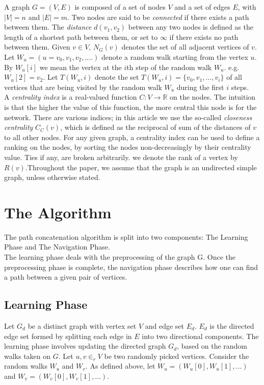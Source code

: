 \documentclass[10pt, conference, compsocconf]{IEEEtran}
\begin{document}
A graph $G=(V,E)$ is composed of a set of nodes $V$ and a set of edges  $E$, with $|V|=n$ and $|E|=m$. Two nodes are said to be {\it connected} if there exists a path between them. The {\it distance} $d(v_1, v_2)$ between any two nodes is defined as the length of a shortest path between them, or set to $\infty$ if there exists no path between them. Given $v \in V$, $N_{G}(v)$ denotes the set of all adjacent vertices of $v$. Let $W_u=(u=v_0,v_1,v_2,....)$ denote a random walk starting from the vertex $u$. By $W_u[i]$ we mean the vertex at the $i$th step of the random walk $W_u$. e.g. $W_u[2]=v_2$. Let $T(W_u,i)$ denote the set $T(W_u,i)=\{v_0,v_1,...,v_i\}$ of all vertices that are being visited by the random walk $W_u$ during the first $i$ steps.\\

A {\it centrality index} is a real-valued function $C: V \rightarrow \mathbb R$ on the nodes. %
The intuition is that the higher the value of this function, the more central this node is for the network. There are various indices; in this article we use the so-called {\it closeness centrality} \cite{Sabidussi66} $C_C(v)$, which is defined as the reciprocal of sum of the distances of $v$ to all other nodes. For any given graph, a centrality index can be used to define a ranking on the nodes, by sorting the nodes non-decreasingly by their centrality value. Ties if any, are broken arbitrarily. we denote the rank of a vertex by $R(v)$.Throughout the paper, we assume that the graph is an undirected simple graph, unless otherwise stated.\\

\section{The Algorithm}
\label{sec:idea}
The path concatenation algorithm is split into two components: The Learning Phase and The Navigation Phase.\\

The learning phase deals with the preprocessing of the graph G. Once the preprocessing phase is complete, the navigation phase describes how one can find a path between a given pair of vertices. 

\subsection{Learning Phase}
\label{sec:4_learning_phase}

Let $G_d$ be a distinct graph with vertex set $V$ and edge set $E_d$. $E_d$ is the directed edge set formed by splitting each edge in $E$ into two directional components. The learning phase involves updating the directed graph $G_d$, based on the random walks taken on $G$. Let $u,v\in_r V$ be two randomly picked vertices. Consider the random walks $W_u$ and $W_v$. As defined above, let $W_u=(W_u[0],W_u[1],...)$ and $W_v=(W_v[0],W_v[1],...)$.\\
\end{document}
